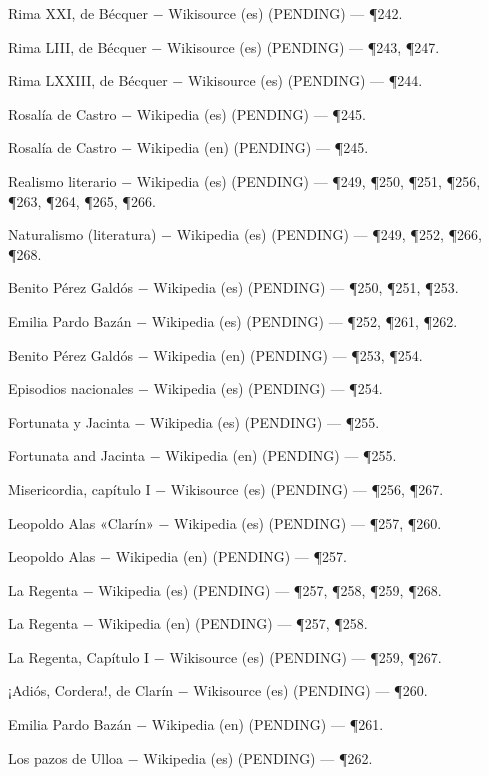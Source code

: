 \documentclass{book}
\begin{document}
\noindent Rima XXI, de Bécquer \(-\) Wikisource (es) (PENDING) --- \P242.

\noindent Rima LIII, de Bécquer \(-\) Wikisource (es) (PENDING) --- \P243, \P247.

\noindent Rima LXXIII, de Bécquer \(-\) Wikisource (es) (PENDING) --- \P244.

\noindent Rosalía de Castro \(-\) Wikipedia (es) (PENDING) --- \P245.

\noindent Rosalía de Castro \(-\) Wikipedia (en) (PENDING) --- \P245.

\noindent Realismo literario \(-\) Wikipedia (es) (PENDING) --- \P249, \P250, \P251, \P256, \P263, \P264, \P265, \P266.

\noindent Naturalismo (literatura) \(-\) Wikipedia (es) (PENDING) --- \P249, \P252, \P266, \P268.

\noindent Benito Pérez Galdós \(-\) Wikipedia (es) (PENDING) --- \P250, \P251, \P253.

\noindent Emilia Pardo Bazán \(-\) Wikipedia (es) (PENDING) --- \P252, \P261, \P262.

\noindent Benito Pérez Galdós \(-\) Wikipedia (en) (PENDING) --- \P253, \P254.

\noindent Episodios nacionales \(-\) Wikipedia (es) (PENDING) --- \P254.

\noindent Fortunata y Jacinta \(-\) Wikipedia (es) (PENDING) --- \P255.

\noindent Fortunata and Jacinta \(-\) Wikipedia (en) (PENDING) --- \P255.

\noindent Misericordia, capítulo I \(-\) Wikisource (es) (PENDING) --- \P256, \P267.

\noindent Leopoldo Alas «Clarín» \(-\) Wikipedia (es) (PENDING) --- \P257, \P260.

\noindent Leopoldo Alas \(-\) Wikipedia (en) (PENDING) --- \P257.

\noindent La Regenta \(-\) Wikipedia (es) (PENDING) --- \P257, \P258, \P259, \P268.

\noindent La Regenta \(-\) Wikipedia (en) (PENDING) --- \P257, \P258.

\noindent La Regenta, Capítulo I \(-\) Wikisource (es) (PENDING) --- \P259, \P267.

\noindent ¡Adiós, Cordera!, de Clarín \(-\) Wikisource (es) (PENDING) --- \P260.

\noindent Emilia Pardo Bazán \(-\) Wikipedia (en) (PENDING) --- \P261.

\noindent Los pazos de Ulloa \(-\) Wikipedia (es) (PENDING) --- \P262.
\end{document}

